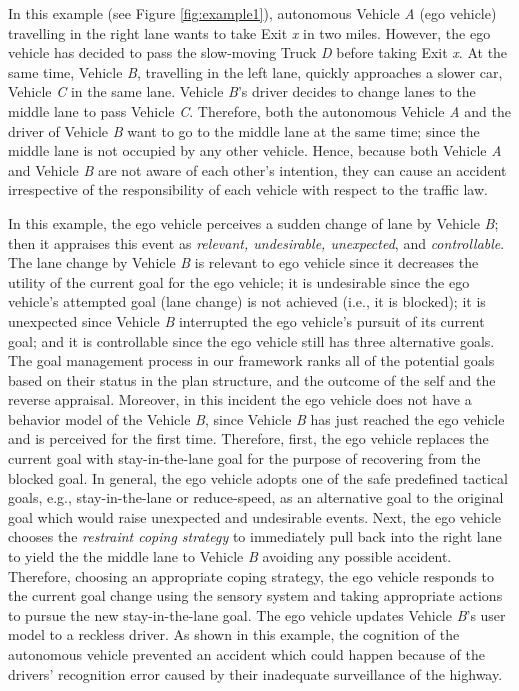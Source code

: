 \documentclass[journal, 11pt]{IEEEtran}
\begin{document}
In this example (see Figure \ref{fig:example1}), autonomous Vehicle \textit{A}
(ego vehicle) travelling in the right lane wants to take Exit \textit{x} in two
miles. However, the ego vehicle has decided to pass the slow-moving Truck
\textit{D} before taking Exit \textit{x}. At the same time, Vehicle \textit{B},
travelling in the left lane, quickly approaches a slower car, Vehicle \textit{C}
in the same lane. Vehicle \textit{B}'s driver decides to change lanes to the
middle lane to pass Vehicle \textit{C}. Therefore, both the autonomous Vehicle
\textit{A} and the driver of Vehicle \textit{B} want to go to the middle lane at
the same time; since the middle lane is not occupied by any other vehicle.
Hence, because both Vehicle \textit{A} and Vehicle \textit{B} are not aware of
each other's intention, they can cause an accident irrespective of the
responsibility of each vehicle with respect to the traffic law.

In this example, the ego vehicle perceives a sudden change of lane by Vehicle
\textit{B}; then it appraises this event as \textit{relevant, undesirable,
unexpected}, and \textit{controllable}. The lane change by Vehicle \textit{B} is
relevant to ego vehicle since it decreases the utility of the current goal for
the ego vehicle; it is undesirable since the ego vehicle's attempted goal (lane
change) is not achieved (i.e., it is blocked); it is unexpected since Vehicle
\textit{B} interrupted the ego vehicle's pursuit of its current goal; and it is
controllable since the ego vehicle still has three alternative goals.
The goal management process in our framework ranks all of the potential goals
based on their status in the plan structure, and the outcome of the self and the
reverse appraisal. Moreover, in this incident the ego vehicle does not have a
behavior model of the Vehicle \textit{B}, since Vehicle \textit{B} has just
reached the ego vehicle and is perceived for the first time. Therefore,
first, the ego vehicle replaces the current goal with stay-in-the-lane goal for
the purpose of recovering from the blocked goal. In general, the ego vehicle
adopts one of the safe predefined tactical goals, e.g., stay-in-the-lane or
reduce-speed, as an alternative goal to the original goal which would raise
unexpected and undesirable events. Next, the ego vehicle chooses the
\textit{restraint coping strategy} to immediately pull back into the right lane
to yield the the middle lane to Vehicle \textit{B} avoiding any possible
accident. Therefore, choosing an appropriate coping strategy, the ego vehicle
responds to the current goal change using the sensory system and taking
appropriate actions to pursue the new stay-in-the-lane goal. The ego vehicle
updates Vehicle \textit{B}'s user model to a reckless driver. As shown in this
example, the cognition of the autonomous vehicle prevented an accident which
could happen because of the drivers' recognition error caused by their
inadequate surveillance of the highway.
\end{document}
